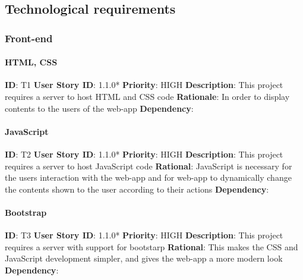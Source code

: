 \documentclass{article}
\begin{document}
\subsection{Technological requirements}

\subsubsection{Front-end}

\paragraph{HTML, CSS}\label{req:hostingLogin}
\textbf{ID}: T1\newline
\textbf{User Story ID}: 1.1.0*\newline
\textbf{Priority}: HIGH\newline
\textbf{Description}: This project requires a server to host HTML and CSS code\newline
\textbf{Rationale}: In order to display contents to the users of the web-app\newline
\textbf{Dependency}:

\paragraph{JavaScript}\label{req:}
\textbf{ID}: T2\newline
\textbf{User Story ID}: 1.1.0*\newline
\textbf{Priority}: HIGH\newline
\textbf{Description}: This project requires a server to host JavaScript code\newline
\textbf{Rational}: JavaScript is necessary for the users interaction with the web-app and for web-app to dynamically change the contents shown to the user according to their actions\newline
\textbf{Dependency}: \newline

\paragraph{Bootstrap}\label{req:}
\textbf{ID}: T3\newline
\textbf{User Story ID}: 1.1.0* \newline
\textbf{Priority}: HIGH\newline
\textbf{Description}: This project requires a server with support for bootstarp\newline
\textbf{Rational}: This makes the CSS and JavaScript development simpler, and gives the web-app a more modern look\newline
\textbf{Dependency}: \newline
\end{document}
